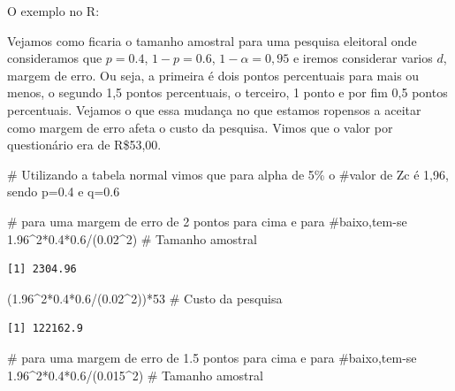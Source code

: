 \documentclass[
  letterpaper,
  DIV=11,
  numbers=noendperiod]{scrartcl}
\newenvironment{Shaded}{\begin{snugshade}}{\end{snugshade}}
\newcommand{\CommentTok}[1]{\textcolor[rgb]{0.37,0.37,0.37}{#1}}
\newcommand{\DecValTok}[1]{\textcolor[rgb]{0.68,0.00,0.00}{#1}}
\newcommand{\FloatTok}[1]{\textcolor[rgb]{0.68,0.00,0.00}{#1}}
\newcommand{\NormalTok}[1]{\textcolor[rgb]{0.00,0.23,0.31}{#1}}
\newcommand{\SpecialCharTok}[1]{\textcolor[rgb]{0.37,0.37,0.37}{#1}}
\begin{document}
\begin{tcolorbox}
O exemplo no R:
\end{tcolorbox}

Vejamos como ficaria o tamanho amostral para uma pesquisa eleitoral onde
consideramos que \(p=0.4\), \(1-p=0.6\), \(1-\alpha=0,95\) e iremos
considerar varios \(d\), margem de erro. Ou seja, a primeira é dois
pontos percentuais para mais ou menos, o segundo 1,5 pontos percentuais,
o terceiro, 1 ponto e por fim 0,5 pontos percentuais. Vejamos o que essa
mudança no que estamos ropensos a aceitar como margem de erro afeta o
custo da pesquisa. Vimos que o valor por questionário era de R\$53,00.

\begin{Shaded}
\begin{Highlighting}[]
\CommentTok{\# Utilizando a tabela normal vimos que para alpha de 5\% o }
  \CommentTok{\#valor de Zc é 1,96, sendo p=0.4 e q=0.6}

\CommentTok{\# para uma margem de erro de 2 pontos para cima e para }
\CommentTok{\#baixo,tem{-}se }
\FloatTok{1.96}\SpecialCharTok{\^{}}\DecValTok{2}\SpecialCharTok{*}\FloatTok{0.4}\SpecialCharTok{*}\FloatTok{0.6}\SpecialCharTok{/}\NormalTok{(}\FloatTok{0.02}\SpecialCharTok{\^{}}\DecValTok{2}\NormalTok{)  }\CommentTok{\# Tamanho amostral}
\end{Highlighting}
\end{Shaded}

\begin{verbatim}
[1] 2304.96
\end{verbatim}

\begin{Shaded}
\begin{Highlighting}[]
\NormalTok{(}\FloatTok{1.96}\SpecialCharTok{\^{}}\DecValTok{2}\SpecialCharTok{*}\FloatTok{0.4}\SpecialCharTok{*}\FloatTok{0.6}\SpecialCharTok{/}\NormalTok{(}\FloatTok{0.02}\SpecialCharTok{\^{}}\DecValTok{2}\NormalTok{))}\SpecialCharTok{*}\DecValTok{53} \CommentTok{\# Custo da pesquisa}
\end{Highlighting}
\end{Shaded}

\begin{verbatim}
[1] 122162.9
\end{verbatim}

\begin{Shaded}
\begin{Highlighting}[]
\CommentTok{\# para uma margem de erro de 1.5 pontos para cima e para }
\CommentTok{\#baixo,tem{-}se }
\FloatTok{1.96}\SpecialCharTok{\^{}}\DecValTok{2}\SpecialCharTok{*}\FloatTok{0.4}\SpecialCharTok{*}\FloatTok{0.6}\SpecialCharTok{/}\NormalTok{(}\FloatTok{0.015}\SpecialCharTok{\^{}}\DecValTok{2}\NormalTok{)  }\CommentTok{\# Tamanho amostral}
\end{Highlighting}
\end{Shaded}
\end{document}
